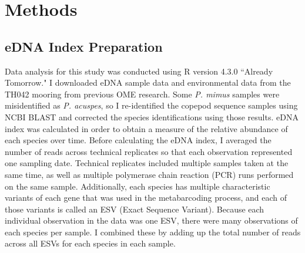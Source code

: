 \documentclass[12pt,twoside]{reedthesis}
\begin{document}
    \chapter{Methods}
    

	\section{eDNA Index Preparation}\label{MethodseDNA}
	Data analysis for this study was conducted using R version 4.3.0 ``Already Tomorrow." I downloaded eDNA sample data and environmental data from the TH042 mooring from previous OME research. Some \textit{P. mimus} samples were misidentified as \textit{P. acuspes}, so I re-identified the copepod sequence samples using NCBI BLAST and corrected the species identifications using those results. eDNA index was calculated in order to obtain a measure of the relative abundance of each species over time. Before calculating the eDNA index, I averaged the number of reads across technical replicates so that each observation represented one sampling date. Technical replicates included multiple samples taken at the same time, as well as multiple polymerase chain reaction (PCR) runs performed on the same sample. Additionally, each species has multiple characteristic variants of each gene that was used in the metabarcoding process, and each of those variants is called an ESV (Exact Sequence Variant). Because each individual observation in the data was one ESV, there were many observations of each species per sample. I combined these by adding up the total number of reads across all ESVs for each species in each sample. 
	
\end{document}
